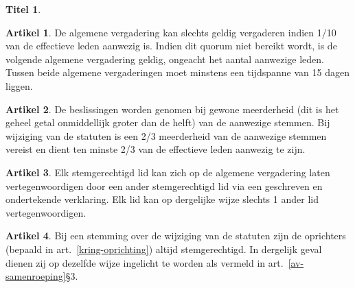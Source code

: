 \documentclass[a4paper,10pt]{article}
\theoremstyle{definition}
\newtheorem{titel}{\newline\Large Titel}
\newtheorem{artikel}{\large Artikel}
\newcommand{\ttextcr}{\hfill\newline}
\begin{document}
\begin{titel}
  \begin{artikel}\ttextcr
    De algemene vergadering kan slechts geldig vergaderen indien 1/10 van de effectieve leden aanwezig is.
    Indien dit quorum niet bereikt wordt, is de volgende algemene vergadering geldig, ongeacht het aantal aanwezige leden.
    Tussen beide algemene vergaderingen moet minstens een tijdspanne van 15 dagen liggen.
  \end{artikel}

  \begin{artikel}\label{av-beslissen}\ttextcr
    De beslissingen worden genomen bij gewone meerderheid (dit is het geheel getal onmiddellijk groter dan de helft) van de aanwezige stemmen.
    Bij wijziging van de statuten is een 2/3 meerderheid van de aanwezige stemmen vereist en dient ten minste 2/3 van de effectieve leden aanwezig te zijn.
  \end{artikel}

  \begin{artikel}\ttextcr
    Elk stemgerechtigd lid kan zich op de algemene vergadering laten vertegenwoordigen door een ander stemgerechtigd lid via een geschreven en ondertekende verklaring.
    Elk lid kan op dergelijke wijze slechts 1 ander lid vertegenwoordigen.
  \end{artikel}

  \begin{artikel}\ttextcr
    Bij een stemming over de wijziging van de statuten zijn de oprichters (bepaald in art.~\ref{kring-oprichting}) altijd stemgerechtigd.
    In dergelijk geval dienen zij op dezelfde wijze ingelicht te worden als vermeld in art.~\ref{av-samenroeping}\S3.
  \end{artikel}


\end{titel}

\end{document}

